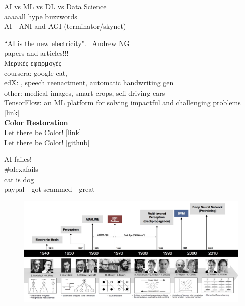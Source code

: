 \documentclass[10pt, compress]{beamer}
\begin{document}
\setcounter{framenumber}{0}

\begin{frame}
  AI vs ML vs DL vs Data Science \\
  aaaaall hype buzzwords \\

  AI - ANI and AGI (terminator/skynet)
\end{frame}

\begin{frame}
  ``AI is the new electricity". ~Andrew NG \\

  papers and articles!!! \\

  Μερικές εφαρμογές \\
  coursera: google cat,  \\
  edX: , speech reenactment, automatic handwriting gen \\
  other:  medical-images, smart-crops, sefl-driving cars \\

  TensorFlow: an ML platform for solving impactful and challenging problems [\href{https://www.youtube.com/watch?v=NlpS-DhayQA}{link}] \\
  \textbf{Color Restoration} \\
  Let there be Color! [\href{http://iizuka.cs.tsukuba.ac.jp/projects/colorization/extra.html}{link}] \\
  Let there be Color! [\href{https://github.com/satoshiiizuka/siggraph2016_colorization}{github}]
\end{frame}

\begin{frame}
AI failes!\\
\#alexafails \\
cat is dog \\
paypal - got scammed - great

\end{frame}

\begin{frame}
\begin{figure}
  \includegraphics[width=1\linewidth]{imgs/nn_timeline}
\end{figure}
\end{frame}
\end{document}
